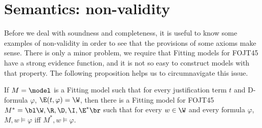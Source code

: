 \section{Semantics: non-validity}

\qquad Before we deal with soundness and completeness, it is useful to know some examples of non-validity in order to see that the provisions of some axioms make sense. There is only a minor problem, we require that Fitting models for FOJT45 have a strong evidence function, and it is not so easy to construct models with that property. The following proposition helps us to circumnavigate this issue.


\begin{pro}
If $M = \model$ is a Fitting model such that for every justification term $t$ and D-formula $\varphi$, $\E(t,\varphi) = \W$, then there is a Fitting model for FOJT45 $M^{*} = \bl\W,\R,\D,\I,\E^{*} \br$ such that for every $w \in \W$ and every formula $\varphi$, $M,w \models \varphi$ iff $M^{*},w \models \varphi$.   
\end{pro}

